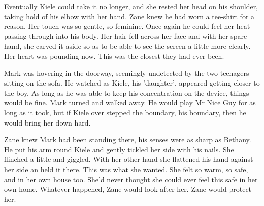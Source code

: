 Eventually Kiele could take it no longer, and she rested her head on his shoulder, taking hold of his elbow with her hand.  Zane knew he had worn a tee-shirt for a reason.  Her touch was so gentle, so feminine.  Once again he could feel her heat passing through into his body.  Her hair fell across her face and with her spare hand, she carved it aside so as to be able to see the screen a little more clearly.  Her heart was pounding now.  This was the closest they had ever been.  

Mark was hovering in the doorway, seemingly undetected by the two teenagers sitting on the sofa.  He watched as Kiele, his 'daughter', appeared getting closer to the boy.  As long as he was able to keep his concentration on the device, things would be fine.  Mark turned and walked away.  He would play Mr Nice Guy for as long as it took, but if Kiele over stepped the boundary, his boundary, then he would bring her down hard.

Zane knew Mark had been standing there, his senses were as sharp as Bethany.  He put his arm round Kiele and gently tickled her side with his nails.  She flinched a little and giggled.  With her other hand she flattened his hand against her side an held it there.  This was what she wanted.  She felt so warm, so safe, and in her own house too.  She'd never thought she could ever feel this safe in her own home.  Whatever happened, Zane would look after her.  Zane would protect her.








